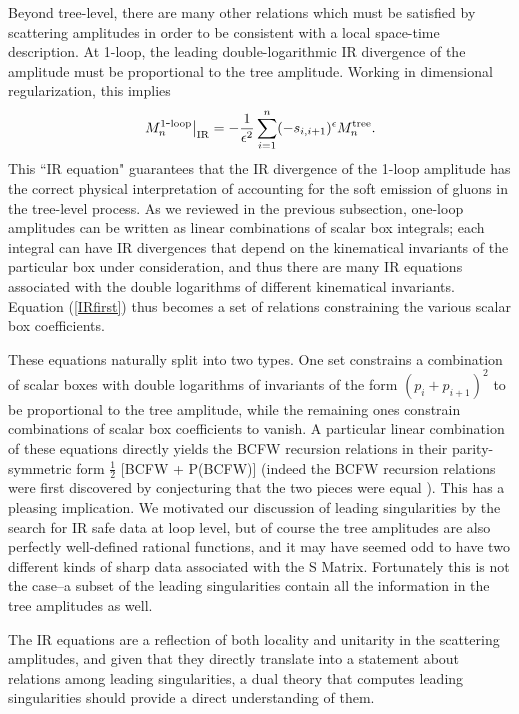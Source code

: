\documentclass[12pt]{article}
\newcommand{\be}{\begin{eqnarray}}
\newcommand{\ee}{\end{eqnarray}}
\begin{document}
Beyond tree-level, there are many other relations which must be satisfied by scattering amplitudes  in order to be consistent with a local space-time description. At 1-loop, the leading double-logarithmic IR divergence of the amplitude must be proportional to the tree amplitude.  Working in dimensional regularization, this implies \cite{IReq, catani}
\be
\label{IRfirst}
\left. M^{\rm 1 \hbox{-} loop}_n\right|_{\rm IR}  = -\frac{1}{\epsilon^2}\sum_{i=1}^n (-s_{i,i+1})^{\epsilon} M^{\rm tree}_n.
\ee
%
This ``IR equation" guarantees that the IR divergence of the 1-loop amplitude has the
correct physical interpretation of accounting for the soft emission
of gluons in the tree-level process. As we reviewed in the previous
subsection, one-loop amplitudes can be written as linear
combinations of scalar box integrals; each integral can have IR
divergences that depend on the kinematical invariants of the
particular box under consideration, and thus there are many IR
equations associated with the double logarithms of different
kinematical invariants. Equation (\ref{IRfirst}) thus becomes a set
of relations constraining the various scalar box coefficients.

These equations naturally split into two types. One set constrains a
combination of scalar boxes with double logarithms of invariants of the form $(p_i+p_{i+1})^2$ to be proportional to the tree amplitude, while the remaining ones
constrain combinations of scalar box coefficients to vanish. A particular linear combination of these equations \cite{Roiban:2004ix,simplest} directly yields the BCFW recursion relations
in their parity-symmetric form  $\frac{1}{2}$ [{\rm BCFW} + {\rm P(BCFW)}] \cite{bcf} (indeed the BCFW recursion relations were first discovered by conjecturing that the two pieces were equal \cite{bcf}). 
This has a pleasing implication. We motivated our discussion of
leading singularities by the search for IR safe data at loop level,
but of course the tree amplitudes are also perfectly well-defined
rational functions, and it may have seemed odd to have two different
kinds of sharp data associated with the S Matrix. Fortunately this
is not the case--a subset of the leading singularities contain all
the information in the tree amplitudes as well.

The IR equations are a reflection of both locality and unitarity in the scattering amplitudes, and
given that they directly translate into a statement about relations
among leading singularities, a dual theory that computes leading
singularities should provide a direct understanding of them. 
\end{document}
